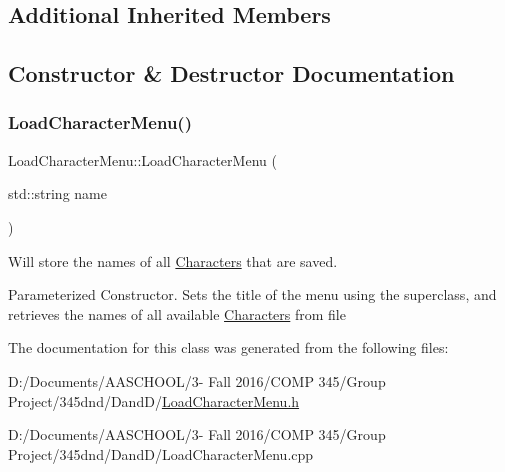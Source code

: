 \subsection*{Additional Inherited Members}


\subsection{Constructor \& Destructor Documentation}
\hypertarget{class_load_character_menu_a22e8fd19aa9a5145b4e1fdb136b8e735}{}\label{class_load_character_menu_a22e8fd19aa9a5145b4e1fdb136b8e735} 
\subsubsection{\texorpdfstring{Load\+Character\+Menu()}{LoadCharacterMenu()}}
{\footnotesize\ttfamily Load\+Character\+Menu\+::\+Load\+Character\+Menu (\begin{DoxyParamCaption}\item[{std\+::string}]{name }\end{DoxyParamCaption})}



Will store the names of all \hyperlink{class_characters}{Characters} that are saved. 

Parameterized Constructor. Sets the title of the menu using the superclass, and retrieves the names of all available \hyperlink{class_characters}{Characters} from file 

The documentation for this class was generated from the following files\+:\begin{DoxyCompactItemize}
\item 
D\+:/\+Documents/\+A\+A\+S\+C\+H\+O\+O\+L/3-\/ Fall 2016/\+C\+O\+M\+P 345/\+Group Project/345dnd/\+Dand\+D/\hyperlink{_load_character_menu_8h}{Load\+Character\+Menu.\+h}\item 
D\+:/\+Documents/\+A\+A\+S\+C\+H\+O\+O\+L/3-\/ Fall 2016/\+C\+O\+M\+P 345/\+Group Project/345dnd/\+Dand\+D/Load\+Character\+Menu.\+cpp\end{DoxyCompactItemize}
